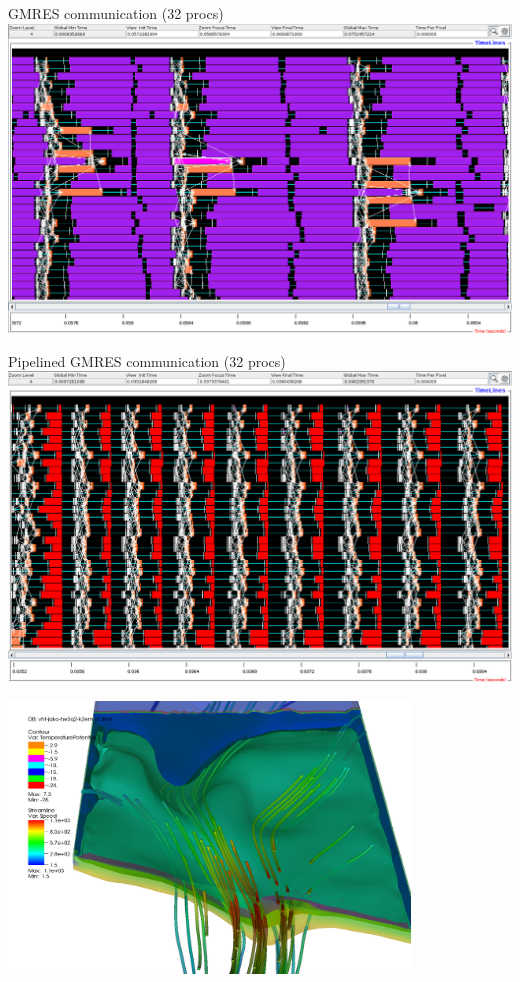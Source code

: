 \documentclass{beamer}
\begin{document}
\begin{frame}{GMRES communication (32 procs)}
  \includegraphics[width=\textwidth]{figures/GMRESJumpshotN32}
\end{frame}
\begin{frame}{Pipelined GMRES communication (32 procs)}
  \includegraphics[width=\textwidth]{figures/PGMRESJumpshotN32}
\end{frame}






\begin{frame}
  \includegraphics[width=0.8\textwidth]{figures/VHT/VHTJakoContourStream}
\end{frame}



%
\end{document}
